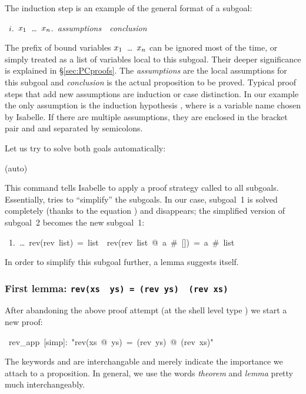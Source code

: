 \begin{isabelle}
\begin{isamarkuptxt}
The induction step is an example of the general format of a subgoal:
\begin{isabellepar}%
~$i$.~{}$x\sb{1}$~\dots~$x\sb{n}$.~{\it assumptions}~{\isasymLongrightarrow}~{\it conclusion}
\end{isabellepar}%
The prefix of bound variables \isasymAnd$x\sb{1}$~\dots~$x\sb{n}$ can be
ignored most of the time, or simply treated as a list of variables local to
this subgoal. Their deeper significance is explained in \S\ref{sec:PCproofs}.
The {\it assumptions} are the local assumptions for this subgoal and {\it
  conclusion} is the actual proposition to be proved. Typical proof steps
that add new assumptions are induction or case distinction. In our example
the only assumption is the induction hypothesis , where  is a variable name chosen by Isabelle. If there
are multiple assumptions, they are enclosed in the bracket pair
 and
 and separated by semicolons.

Let us try to solve both goals automatically:%
\end{isamarkuptxt}%
(auto)%
\begin{isamarkuptxt}%
\noindent
This command tells Isabelle to apply a proof strategy called
 to all subgoals. Essentially,  tries to
``simplify'' the subgoals.  In our case, subgoal~1 is solved completely (thanks
to the equation ) and disappears; the simplified version
of subgoal~2 becomes the new subgoal~1:
\begin{isabellepar}%
~1.~\dots~rev(rev~list)~=~list~{\isasymLongrightarrow}~rev(rev~list~@~a~\#~[])~=~a~\#~list
\end{isabellepar}%
In order to simplify this subgoal further, a lemma suggests itself.%
\end{isamarkuptxt}%
%
\begin{isamarkuptext}%
\subsubsection*{First lemma: \texttt{rev(xs \at~ys) = (rev ys) \at~(rev xs)}}

After abandoning the above proof attempt (at the shell level type
) we start a new proof:%
\end{isamarkuptext}%
~rev\_app~[simp]:~{"}rev(xs~@~ys)~=~(rev~ys)~@~(rev~xs){"}%
\begin{isamarkuptxt}%
\noindent The keywords  and
 are interchangable and merely indicate
the importance we attach to a proposition. In general, we use the words
\emph{theorem} and \emph{lemma} pretty much
interchangeably.


\end{isamarkuptxt}
\end{isabelle}
